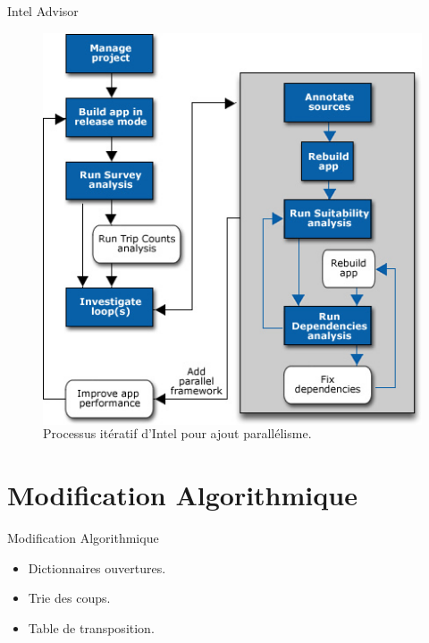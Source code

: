 \documentclass{beamer}
\begin{document}
\begin{frame}{Intel Advisor}
	\begin{figure}
	\begin{columns}
      \includegraphics[width=\textwidth]{Intel.jpg}
      \caption{Processus itératif d'Intel pour ajout parallélisme.\label{Fig:intel_iter}}
    \end{columns}	
    \end{figure}
\end{frame}

\section{Modification Algorithmique}


\begin{frame}{Modification Algorithmique}

\begin{itemize}
  \item
    Dictionnaires ouvertures.
  \item
    Trie des coups.
  \item
    Table de transposition.
 \end{itemize}	
\end{frame}
\end{document}
